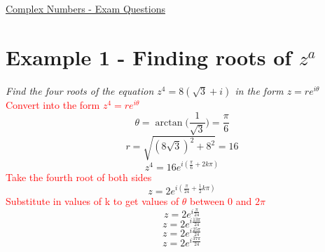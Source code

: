 \documentclass{article}[18pt]
\begin{document}
\begin{center}
\underline{\huge Complex Numbers - Exam Questions}
\end{center}
\section{Example 1 - Finding roots of $z^a$}
\textit{Find the four roots of the equation {\large$z^4=8(\sqrt{3}+i)$} in the form {\large$z=re^{i\theta}$}}
\\
\textcolor{red}{Convert into the form {\large $z^4=re^{i\theta}$}}
$$\theta=\arctan\bigg(\frac{1}{\sqrt{3}}\bigg)=\frac{\pi}{6}$$
$$r=\sqrt{(8\sqrt{3})^2+8^2}=16$$
{\Large
$$z^4=16e^{i(\frac{\pi}{6}+2k\pi)}$$}
\textcolor{red}{Take the fourth root of both sides}
{\Large
$$z=2e^{i(\frac{\pi}{24}+\frac{1}{2}k\pi)}$$}
\textcolor{red}{Substitute in values of k to get values of $\theta$ between 0 and $2\pi$}
{\large
$$z=2e^{i\frac{\pi}{24}}$$
$$z=2e^{i\frac{13\pi}{24}}$$
$$z=2e^{i\frac{25\pi}{24}}$$
$$z=2e^{i\frac{37\pi}{24}}$$}
\end{document}
